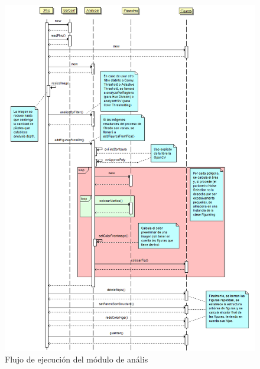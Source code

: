 		\begin{figure}[htbp]
		\centering
		\includegraphics[scale=0.47]{graphics/diagramaflujoPHIC.png}
		\caption{Flujo de ejecución del módulo de anális}
		\label{fig:diagramaflujoPHIC}
		\end{figure}